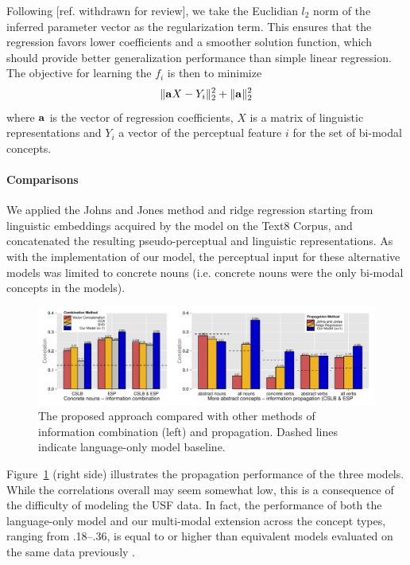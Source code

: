 Following [ref. withdrawn for review], we take the Euclidian \( l_2 \) norm of the inferred parameter vector as the regularization term. This ensures that the regression favors lower coefficients and a smoother solution function, which should provide better generalization performance than simple linear regression. The objective for learning the \( f_i \) is then to minimize \[ \| {\bf a}X - Y_i \|_2^2 + \|{\bf a}\|_2^2 \]where \( {\bf a}\) is the vector of regression coefficients, \( X \) is a matrix of linguistic representations and \(  Y_i \) a vector of the perceptual feature \(i\) for the set of bi-modal concepts.

\paragraph{Comparisons}We applied the Johns and Jones method and ridge regression starting from linguistic embeddings acquired by the \cite{mikolov2013efficient} model on the Text8 Corpus, and concatenated the resulting pseudo-perceptual and linguistic representations. As with the implementation of our model, the perceptual input for these alternative models was limited to concrete nouns (i.e. concrete nouns were the only bi-modal concepts in the models).

 \begin{figure}  \includegraphics[width = \textwidth]{Chapter_3/Graph_1_EMNLP2014}  \caption{\label{main_results} The proposed approach compared with other methods of information combination (left) and propagation. Dashed lines indicate language-only model baseline.}\end{figure}

Figure~\ref{main_results} (right side) illustrates the propagation performance of the three models. While the correlations overall may seem somewhat low, this is a consequence of the difficulty of modeling the USF data. In fact, the performance of both the language-only model and our multi-modal extension across the concept types, ranging from .18--.36, is equal to or higher than equivalent models evaluated on the same data previously \cite{feng2010visual,silberer2012grounded,silberer2013models}. 

